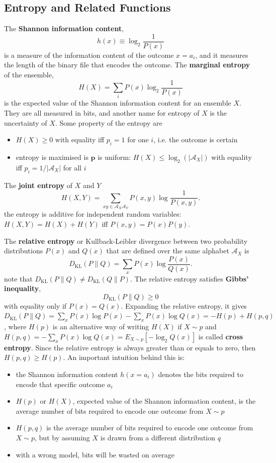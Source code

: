 \documentclass[11pt]{article}
\begin{document}
\subsection{Entropy and Related Functions}
The \textbf{Shannon information content},
  \[
    h(x) \equiv \log_2 \frac{1}{P(x)}
  \]
is a measure of the information content of the outcome $x=a_i$, and it measures the length of the binary file that encodes the outcome. The \textbf{marginal entropy} of the ensemble,
  \[
    H(X) = \sum_i P(x)\log_2 \frac{1}{P(x)}
  \]
\noindent is the expected value of the Shannon information content for an ensemble $X$. They are all measured in bits, and another name for entropy of $X$ is the uncertainty of $X$. Some property of the entropy are
\begin{itemize}
  \item $H(X) \geq 0$ with equality iff $p_i = 1$ for one $i$, i.e. the outcome is certain
  \item entropy is maximised is $\mathbf{p}$ is uniform: $H(X) \leq \log_2 (|\mathcal{A}_X|)$ with equality iff $p_i = 1/|\mathcal{A}_X|$ for all $i$
\end{itemize}

The \textbf{joint entropy} of $X$ and $Y$
\[
  H(X,Y) = \sum_{xy \in \mathcal{A}_X \mathcal{A}_Y} P(x,y)\log \frac{1}{P(x,y)}.
\]
the entropy is additive for independent random variables: $H(X,Y) = H(X) + H(Y)$ iff $P(x,y)=P(x)P(y)$.

The \textbf{relative entropy} or Kullback-Leibler divergence between two probability distributions $P(x)$ and $Q(x)$ that are defined over the same
alphabet $\mathcal{A}_X$ is
\[
  D_{\mathrm{KL}}(P\|Q) = \sum_x P(x)\log \frac{P(x)}{Q(x)}.
\]
note that $D_{\mathrm{KL}}(P\|Q)\neq D_{\mathrm{KL}}(Q\|P)$. The relative entropy satisfies \textbf{Gibbs' inequality},
\[
  D_{\mathrm{KL}}(P\|Q) \ge 0
\]
with equality only if $P(x) = Q(x)$. Expanding the relative entropy, it gives $D_{\mathrm{KL}}(P\|Q) = \sum_x P(x)\log P(x) - \sum_x P(x) \log Q(x) = -H(p) + H(p,q)$, where $H(p)$ is an alternative way of writing $H(X)$ if $X \sim p$ and $H(p,q) = -\sum_x P(x) \log Q(x) = E_{X \sim p}[-\log_2 Q(x)]$ is called \textbf{cross entropy}. Since the relative entropy is always greater than or equals to zero, then $H(p,q) \geq H(p)$. An important intuition behind this is:
\begin{itemize}
  \item the Shannon information content $h(x = a_i)$ denotes the bits required to encode that specific outcome $a_i$
  \item $H(p)$ or $H(X)$, expected value of the Shannon information content, is the average number of bits required to encode one outcome from $X \sim p$
  \item $H(p,q)$ is the average number of bits required to encode one outcome from $X \sim p$, but by assuming $X$ is drawn from a different distribution $q$
  \item with a wrong model, bits will be wasted on average
\end{itemize}
\end{document}
